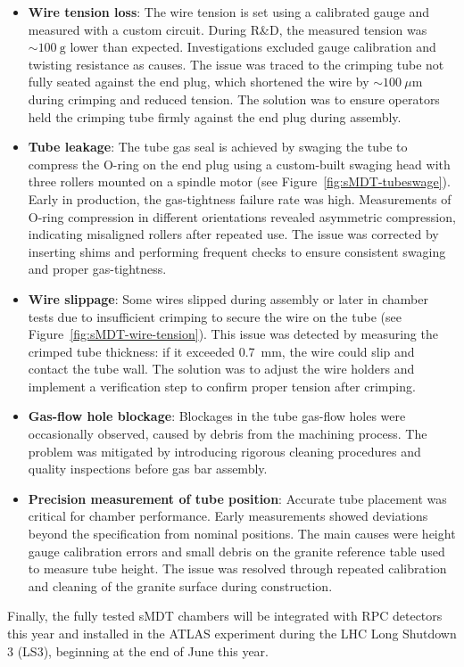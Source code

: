 \begin{itemize}
    \item \textbf{Wire tension loss}:  
    The wire tension is set using a calibrated gauge and measured with a custom circuit. During R\&D, the measured tension was $\sim 100~\text{g}$ lower than expected. Investigations excluded gauge calibration and twisting resistance as causes. The issue was traced to the crimping tube not fully seated against the end plug, which shortened the wire by $\sim 100~\mu\text{m}$ during crimping and reduced tension. The solution was to ensure operators held the crimping tube firmly against the end plug during assembly.

    \item \textbf{Tube leakage}:  
    The tube gas seal is achieved by swaging the tube to compress the O-ring on the end plug using a custom-built swaging head with three rollers mounted on a spindle motor (see Figure~\ref{fig:sMDT-tubeswage}). Early in production, the gas-tightness failure rate was high. Measurements of O-ring compression in different orientations revealed asymmetric compression, indicating misaligned rollers after repeated use. The issue was corrected by inserting shims and performing frequent checks to ensure consistent swaging and proper gas-tightness.

    \item \textbf{Wire slippage}:  
    Some wires slipped during assembly or later in chamber tests due to insufficient crimping to secure the wire on the tube (see Figure~\ref{fig:sMDT-wire-tension}). This issue was detected by measuring the crimped tube thickness: if it exceeded 0.7~mm, the wire could slip and contact the tube wall. The solution was to adjust the wire holders and implement a verification step to confirm proper tension after crimping.

    \item \textbf{Gas-flow hole blockage}:  
    Blockages in the tube gas-flow holes were occasionally observed, caused by debris from the machining process. The problem was mitigated by introducing rigorous cleaning procedures and quality inspections before gas bar assembly.

    \item \textbf{Precision measurement of tube position}:  
    Accurate tube placement was critical for chamber performance. Early measurements showed deviations beyond the specification from nominal positions. The main causes were height gauge calibration errors and small debris on the granite reference table used to measure tube height. The issue was resolved through repeated calibration and cleaning of the granite surface during construction.
\end{itemize}

Finally, the fully tested sMDT chambers will be integrated with RPC detectors this year and installed in the ATLAS experiment during the LHC Long Shutdown 3 (LS3), beginning at the end of June this year.